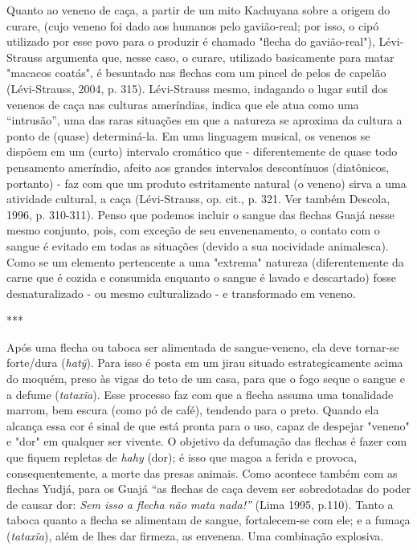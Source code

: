 Quanto ao veneno de caça, a partir de um mito Kachuyana sobre a origem
do curare, (cujo veneno foi dado aos humanos pelo gavião-real; por isso,
o cipó utilizado por esse povo para o produzir é chamado "flecha do
gavião-real"), Lévi-Strauss argumenta que, nesse caso, o curare,
utilizado basicamente para matar "macacos coatás", é besuntado nas
flechas com um pincel de pelos de capelão (Lévi-Strauss, 2004, p. 315).
Lévi-Strauss mesmo, indagando o lugar sutil dos venenos de caça nas
culturas ameríndias, indica que ele atua como uma ``intrusão'', uma das
raras situações em que a natureza se aproxima da cultura a ponto de
(quase) determiná-la. Em uma linguagem musical, os venenos se dispõem em
um (curto) intervalo cromático que - diferentemente de quase todo
pensamento ameríndio, afeito aos grandes intervalos descontínuos
(diatônicos, portanto) - faz com que um produto estritamente natural (o
veneno) sirva a uma atividade cultural, a caça (Lévi-Strauss, op. cit.,
p. 321. Ver também Descola, 1996, p. 310-311). Penso que podemos incluir
o sangue das flechas Guajá nesse mesmo conjunto, pois, com exceção de
seu envenenamento, o contato com o sangue é evitado em todas as
situações (devido a sua nocividade animalesca). Como se um elemento
pertencente a uma "extrema" natureza (diferentemente da carne que é
cozida e consumida enquanto o sangue é lavado e descartado) fosse
desnaturalizado - ou mesmo culturalizado - e transformado em veneno.

***

Após uma flecha ou taboca ser alimentada de sangue-veneno, ela deve
tornar-se forte/dura (\emph{hatỹ}). Para isso é posta em um jirau
situado estrategicamente acima do moquém, preso às vigas do teto de um
casa, para que o fogo seque o sangue e a defume (\emph{tataxĩa}). Esse
processo faz com que a flecha assuma uma tonalidade marrom, bem escura
(como pó de café), tendendo para o preto. Quando ela alcança essa cor é
sinal de que está pronta para o uso, capaz de despejar "veneno" e "dor"
em qualquer ser vivente. O objetivo da defumação das flechas é fazer com
que fiquem repletas de \emph{hahy} (dor); é isso que magoa a ferida e
provoca, consequentemente, a morte das presas animais. Como acontece
também com as flechas Yudjá, para os Guajá ``as flechas de caça devem
ser sobredotadas do poder de causar dor: \emph{Sem isso a flecha não
mata nada!''} (Lima 1995, p.110). Tanto a taboca quanto a flecha se
alimentam de sangue, fortalecem-se com ele; e a fumaça (\emph{tataxĩa}),
além de lhes dar firmeza, as envenena. Uma combinação explosiva.

